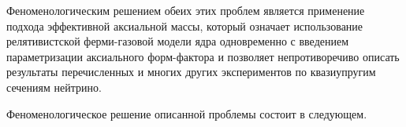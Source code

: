 Феноменологическим решением обеих этих проблем является применение подхода эффективной аксиальной массы, который означает использование релятивистской ферми-газовой модели ядра одновременно с введением параметризации аксиального форм-фактора и позволяет непротиворечиво описать результаты перечисленных и многих других экспериментов по квазиупругим сечениям нейтрино.

Феноменологическое решение описанной проблемы состоит в следующем.
